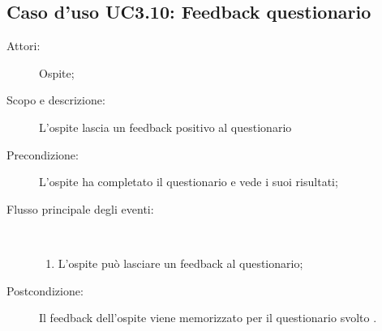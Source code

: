 \subsection{Caso d'uso UC3.10: Feedback questionario}\begin{description}
	\item[Attori:] Ospite;
	\item[Scopo e descrizione:] L'ospite lascia un feedback positivo al questionario
	\item[Precondizione:] L'ospite ha completato il questionario e vede i suoi risultati;
	
	\item[Flusso principale degli eventi:] \ 
	\begin{enumerate}
		\item L'ospite può lasciare un feedback al questionario;
		
	\end{enumerate}
	\item[Postcondizione:] Il feedback dell'ospite viene memorizzato per il questionario svolto .
\end{description}
\hypertarget{UC3.11}{}
